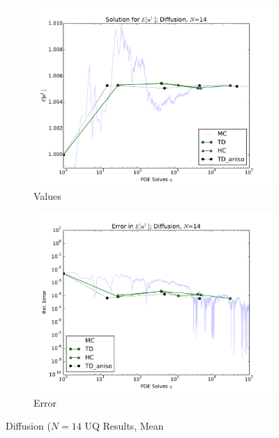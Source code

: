 \documentclass[11pt]{article}
\begin{document}
\begin{figure}[H]
    \centering
    \begin{subfigure}[b]{0.49 \textwidth}
      \includegraphics[width=\textwidth]{../graphics/N14_aniso_vals}
      \caption{Values}
      \label{atn vals hdmr}
  \end{subfigure}
\begin{subfigure}[b]{0.49 \textwidth}
\centering
      \includegraphics[width=\textwidth]{../graphics/N14_aniso_errs}
      \caption{Error}
      \label{atn errs hdmr}
    \end{subfigure}
  \caption{Diffusion ($N=14$ UQ Results, Mean}
  \label{diff14 anis mean}
  \end{figure}
\end{document}
